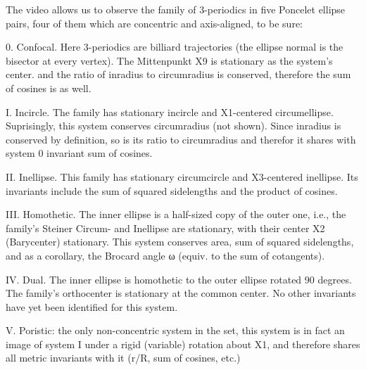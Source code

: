 The video allows us to observe the family of 3-periodics in five Poncelet ellipse pairs, four of them which are concentric and axis-aligned, to be sure:

0. Confocal. Here 3-periodics are billiard trajectories (the ellipse normal is the bisector at every vertex). The Mittenpunkt X9 is stationary as the system's center. and the ratio of inradius to circumradius is conserved, therefore the sum of cosines is as well.

I. Incircle. The family has stationary incircle and X1-centered circumellipse. Suprisingly, this system conserves circumradius (not shown). Since inradius is conserved by definition, so is its ratio to circumradius and therefor it shares with system 0 invariant sum of cosines.

II. Inellipse. This family has stationary circumcircle and X3-centered inellipse. Its invariants include the sum of squared sidelengths and the product of cosines.

III. Homothetic. The inner ellipse is a half-sized copy of the outer one, i.e., the family's Steiner Circum- and Inellipse are stationary, with their center X2 (Barycenter) stationary. This system conserves area, sum of squared sidelengths, and as a corollary, the Brocard angle ω (equiv. to the sum of cotangents).

IV. Dual. The inner ellipse is homothetic to the outer ellipse rotated 90 degrees. The family's orthocenter is stationary at the common center. No other invariants have yet been identified for this system.

V. Poristic: the only non-concentric system in the set, this system is in fact an image of system I under a rigid (variable) rotation about X1, and therefore shares all metric invariants with it (r/R, sum of cosines, etc.)